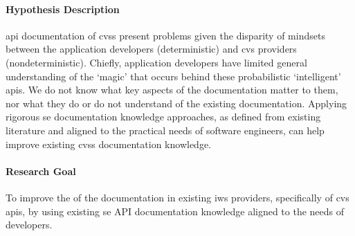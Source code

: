 \paragraph{Hypothesis Description}
\gls{api} documentation of \glspl{cvs} present problems given the disparity of mindsets between the application developers (deterministic) and \gls{cvs} providers (nondeterministic). Chiefly, application developers have limited general understanding of the `magic' that occurs behind these probabilistic `intelligent' \glspl{api}. We do not know what key aspects of the documentation matter to them, nor what they do or do not understand of the existing documentation. Applying rigorous \gls{se} documentation knowledge approaches, as defined from existing literature and aligned to the practical needs of software engineers, can help improve existing \glspl{cvs} documentation knowledge.

\paragraph{Research Goal}
To improve the  of the documentation in existing \gls{iws} providers, specifically of \gls{cvs} \glspl{api}, by using existing \gls{se} API documentation knowledge aligned to the needs of developers.

